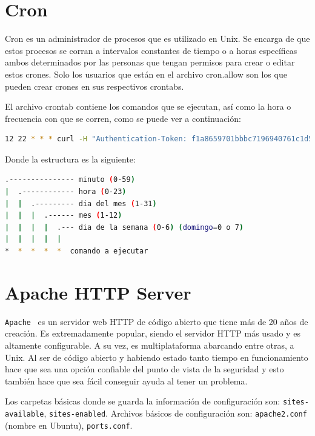 \section{Cron}
Cron es un administrador de procesos que es utilizado en Unix. Se encarga de que estos procesos se corran a intervalos constantes de tiempo o a horas específicas ambos determinados por las personas que tengan permisos para crear o editar estos crones. Solo los usuarios que están en el archivo cron.allow son los que pueden crear crones en sus respectivos crontabs. 

El archivo crontab contiene los comandos que se ejecutan, así como la hora o frecuencia con que se corren, como se puede ver a continuación:

\begin{lstlisting}[language=bash]
12 22 * * * curl -H "Authentication-Token: f1a8659701bbbc7196940761c1d55c3b9a25fb6569a863df"  -X POST -d '{"state":"0","device_id":"12395613"}' http://localhost:5000/set_led_state
\end{lstlisting}

Donde la estructura es la siguiente:

\begin{lstlisting}[language=bash]
.--------------- minuto (0-59) 
|  .------------ hora (0-23)
|  |  .--------- dia del mes (1-31)
|  |  |  .------ mes (1-12) 
|  |  |  |  .--- dia de la semana (0-6) (domingo=0 o 7) 
|  |  |  |  |
*  *  *  *  *  comando a ejecutar
\end{lstlisting}

\section{Apache HTTP Server}

\lstinline[columns=fixed]{Apache}~\cite{Apache} es un servidor web HTTP de código abierto que tiene más de 20 años de creación. Es extremadamente popular, siendo el servidor HTTP más usado y es altamente configurable.  A su vez, es multiplataforma abarcando entre otras, a Unix. Al ser de código abierto y habiendo estado tanto tiempo en funcionamiento hace que sea una opción confiable del punto de vista de la seguridad y esto también hace que sea fácil conseguir ayuda al tener un problema.

Los carpetas básicas donde se guarda la información de configuración son: \lstinline[columns=fixed]{sites-available}, \lstinline[columns=fixed]{sites-enabled}. Archivos básicos de configuración son: \lstinline[columns=fixed]{apache2.conf}  (nombre en Ubuntu), \lstinline[columns=fixed]{ports.conf}.

